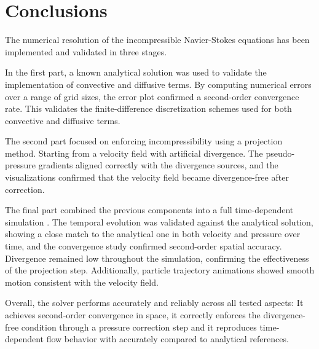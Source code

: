 \newpage

\section{Conclusions}

\bigskip

The numerical resolution of the incompressible Navier-Stokes equations has been implemented and validated in three stages.

In the first part, a known analytical solution was used to validate the implementation of convective and diffusive terms. By computing numerical errors over a range of grid sizes, the error plot confirmed a second-order convergence rate. This validates the finite-difference discretization schemes used for both convective and diffusive terms.

The second part focused on enforcing incompressibility using a projection method. Starting from a velocity field with artificial divergence. The pseudo-pressure gradients aligned correctly with the divergence sources, and the visualizations confirmed that the velocity field became divergence-free after correction.

The final part combined the previous components into a full time-dependent simulation . The temporal evolution was validated against the analytical solution, showing a close match to the analytical one in both velocity and pressure over time, and the convergence study confirmed second-order spatial accuracy. Divergence remained low throughout the simulation, confirming the effectiveness of the projection step. Additionally, particle trajectory animations showed smooth motion consistent with the velocity field.

Overall, the solver performs accurately and reliably across all tested aspects:
It achieves second-order convergence in space, it correctly enforces the divergence-free condition through a pressure correction step and it reproduces time-dependent flow behavior with accurately compared to analytical references.